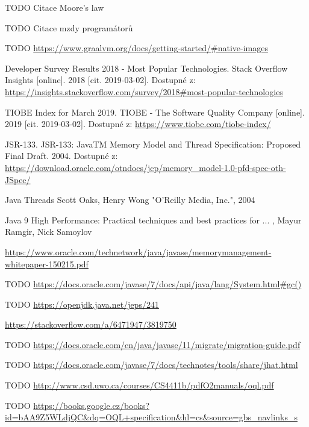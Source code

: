\begin{literatura}{99}

    TODO Citace Moore's law

    TODO Citace mzdy programátorů

    TODO \url{https://www.graalvm.org/docs/getting-started/#native-images}

	Developer Survey Results 2018 - Most Popular Technologies. Stack Overflow Insights [online]. 2018 [cit. 2019-03-02]. Dostupné z: \url{https://insights.stackoverflow.com/survey/2018#most-popular-technologies}

    TIOBE Index for March 2019. TIOBE - The Software Quality Company [online]. 2019 [cit. 2019-03-02]. Dostupné z: \url{https://www.tiobe.com/tiobe-index/}

    JSR-133. JSR-133: JavaTM Memory Model and Thread Specification: Proposed Final Draft. 2004. Dostupné z: \url{https://download.oracle.com/otndocs/jcp/memory_model-1.0-pfd-spec-oth-JSpec/}

Java Threads
Scott Oaks, Henry Wong
"O'Reilly Media, Inc.", 2004

    Java 9 High Performance: Practical techniques and best practices for ... , Mayur Ramgir, Nick Samoylov

    \url{https://www.oracle.com/technetwork/java/javase/memorymanagement-whitepaper-150215.pdf}

    
    TODO \url{https://docs.oracle.com/javase/7/docs/api/java/lang/System.html#gc()}

    TODO \url{https://openjdk.java.net/jeps/241}

    \url{https://stackoverflow.com/a/6471947/3819750}

    TODO \url{https://docs.oracle.com/en/java/javase/11/migrate/migration-guide.pdf }

    TODO \url{https://docs.oracle.com/javase/7/docs/technotes/tools/share/jhat.html}

    TODO \url{http://www.csd.uwo.ca/courses/CS4411b/pdfO2manuals/oql.pdf}

    TODO \url{https://books.google.cz/books?id=bAA9Z5WLdjQC&dq=OQL+specification&hl=cs&source=gbs_navlinks_s}


\end{literatura}
